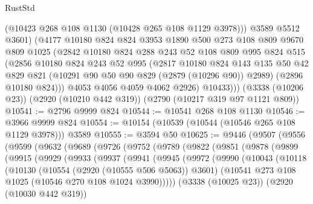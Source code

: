 \begin{lexlean}{RustStd}
\begin{coremodule}
            (@10423 @268 @108 @1130 (@10428 @265 @108 @1129 @3978)))
          @3589
          @5512
          @3601)
        (@4177
          @10180
          @824
          @824
          @3953
          @1890
          @500
          @273
          @108
          @809
          @9670
          @809
          @1025
          (@2842
            @10180
            @824
            @288
            @243
            @52
            @108
            @809
            @995
            @824
            @515
            (@2856
              @10180
              @824
              @243
              @52
              @995
              (@2817
                @10180
                @824
                @143
                @135
                @50
                @42
                @829
                @821
                (@10291 @90 @50 @90 @829 (@2879 (@10296 @90)) @2989)
                (@2896 @10180 @824)))
            @4053
            @4056
            @4059
            @4062
            @2926)
          @10433)))
    (@3338 (@10206 @23))
    (@2920 (@10210 @442 @319))
    (@2790 (@10217 @319 @97 @1121 @809))
@10541 := @2796 @9999 @824
@10544 := @10541 @268 @108 @1130
@10546 := @3966 @9999 @824
@10554 := @10154 (@10539 (@10544 (@10546 @265 @108 @1129 @3978))) @3589
@10555 := @3594 @50
@10625 := @9446
    (@9507
      (@9556
        (@9599
          (@9632
            (@9689
              (@9726
                (@9752
                  (@9789
                    (@9822
                      (@9851
                        (@9878
                          (@9899
                            (@9915
                              (@9929
                                (@9933
                                  (@9937
                                    (@9941
                                      (@9945
                                        (@9972
                                          (@9990
                                            (@10043
                                              (@10118
                                                (@10130
                                                  (@10554 (@2920 (@10555 @506 @5063)) @3601)
                                                  (@10541
                                                    @273
                                                    @108
                                                    @1025
                                                    (@10546 @270 @108 @1024 @3990)))))
                                            (@3338 (@10025 @23))
                                            (@2920 (@10030 @442 @319))

\end{coremodule}
\end{lexlean}

